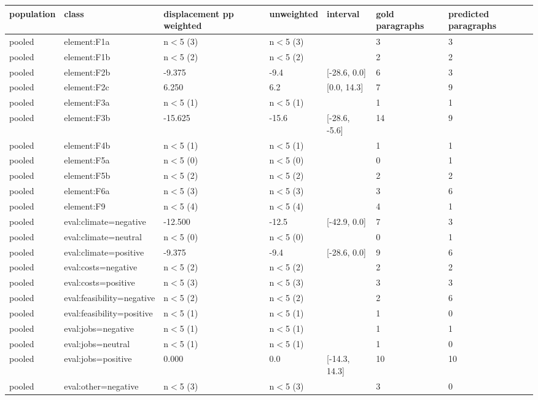 \begin{table}[htbp]
\centering
\small
\begin{tabular}{lllllll}
\toprule
\textbf{population} & \textbf{class} & \textbf{displacement pp weighted} & \textbf{unweighted} & \textbf{interval} & \textbf{gold paragraphs} & \textbf{predicted paragraphs} \\
\midrule
pooled & element:F1a & n$<$5 (3) & n$<$5 (3) &  & 3 & 3 \\
pooled & element:F1b & n$<$5 (2) & n$<$5 (2) &  & 2 & 2 \\
pooled & element:F2b & -9.375 & -9.4 & [-28.6, 0.0] & 6 & 3 \\
pooled & element:F2c & 6.250 & 6.2 & [0.0, 14.3] & 7 & 9 \\
pooled & element:F3a & n$<$5 (1) & n$<$5 (1) &  & 1 & 1 \\
pooled & element:F3b & -15.625 & -15.6 & [-28.6, -5.6] & 14 & 9 \\
pooled & element:F4b & n$<$5 (1) & n$<$5 (1) &  & 1 & 1 \\
pooled & element:F5a & n$<$5 (0) & n$<$5 (0) &  & 0 & 1 \\
pooled & element:F5b & n$<$5 (2) & n$<$5 (2) &  & 2 & 2 \\
pooled & element:F6a & n$<$5 (3) & n$<$5 (3) &  & 3 & 6 \\
pooled & element:F9 & n$<$5 (4) & n$<$5 (4) &  & 4 & 1 \\
pooled & eval:climate=negative & -12.500 & -12.5 & [-42.9, 0.0] & 7 & 3 \\
pooled & eval:climate=neutral & n$<$5 (0) & n$<$5 (0) &  & 0 & 1 \\
pooled & eval:climate=positive & -9.375 & -9.4 & [-28.6, 0.0] & 9 & 6 \\
pooled & eval:costs=negative & n$<$5 (2) & n$<$5 (2) &  & 2 & 2 \\
pooled & eval:costs=positive & n$<$5 (3) & n$<$5 (3) &  & 3 & 3 \\
pooled & eval:feasibility=negative & n$<$5 (2) & n$<$5 (2) &  & 2 & 6 \\
pooled & eval:feasibility=positive & n$<$5 (1) & n$<$5 (1) &  & 1 & 0 \\
pooled & eval:jobs=negative & n$<$5 (1) & n$<$5 (1) &  & 1 & 1 \\
pooled & eval:jobs=neutral & n$<$5 (1) & n$<$5 (1) &  & 1 & 0 \\
pooled & eval:jobs=positive & 0.000 & 0.0 & [-14.3, 14.3] & 10 & 10 \\
pooled & eval:other=negative & n$<$5 (3) & n$<$5 (3) &  & 3 & 0 \\

\end{tabular}
\end{table}
